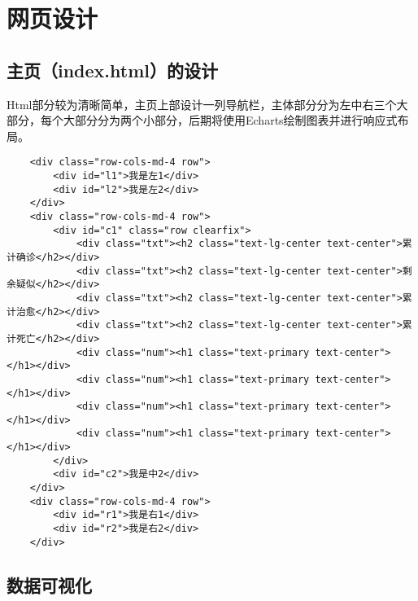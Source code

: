 \chapter{网页设计}

\section{主页（index.html）的设计}

Html部分较为清晰简单，主页上部设计一列导航栏，主体部分分为左中右三个大部分，每个大部分分为两个小部分，后期将使用Echarts绘制图表并进行响应式布局。

\begin{lstlisting}
    <div class="row-cols-md-4 row">
        <div id="l1">我是左1</div>
        <div id="l2">我是左2</div>
    </div>
    <div class="row-cols-md-4 row">
        <div id="c1" class="row clearfix">
            <div class="txt"><h2 class="text-lg-center text-center">累计确诊</h2></div>
            <div class="txt"><h2 class="text-lg-center text-center">剩余疑似</h2></div>
            <div class="txt"><h2 class="text-lg-center text-center">累计治愈</h2></div>
            <div class="txt"><h2 class="text-lg-center text-center">累计死亡</h2></div>
            <div class="num"><h1 class="text-primary text-center"></h1></div>
            <div class="num"><h1 class="text-primary text-center"></h1></div>
            <div class="num"><h1 class="text-primary text-center"></h1></div>
            <div class="num"><h1 class="text-primary text-center"></h1></div>
        </div>
        <div id="c2">我是中2</div>
    </div>
    <div class="row-cols-md-4 row">
        <div id="r1">我是右1</div>
        <div id="r2">我是右2</div>
    </div>
\end{lstlisting}

\section{数据可视化}

